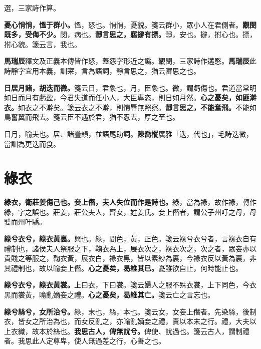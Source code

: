 \begin{quoting}選，三家詩作算。\end{quoting}

\textbf{憂心悄悄，慍于群小。}{\footnotesize 慍，怒也。悄悄，憂貌。箋云群小，眾小人在君側者。}\textbf{覯閔既多，受侮不少。}{\footnotesize 閔，病也。}\textbf{靜言思之，寤擗有摽。}{\footnotesize 靜，安也。擗，拊心也。摽，拊心貌。箋云言，我也。}

\begin{quoting}\textbf{馬瑞辰}釋文及正義本傳皆作怒，蓋怨字形近之譌。覯閔，三家詩作遘愍。\textbf{馬瑞辰}此詩靜字宜用本義，訓宷，言為語詞，靜言思之，猶云審思之也。\end{quoting}

\textbf{日居月諸，胡迭而微。}{\footnotesize 箋云日，君象也，月，臣象也。微，謂虧傷也。君道當常明如日而月有虧盈，今君失道而任小人，大臣專恣，則日如月然。}\textbf{心之憂矣，如匪澣衣。}{\footnotesize 如衣之不澣矣。箋云衣之不澣，則憒辱無照察。}\textbf{靜言思之，不能奮飛。}{\footnotesize 不能如鳥奮翼而飛去。箋云臣不遇於君，猶不忍去，厚之至也。}

\begin{quoting}日月，喻夫也。居、諸疊韻，並語尾助詞。\textbf{陳喬樅}廣雅「迭，代也」，毛詩迭微，當訓為更迭而食。\end{quoting}

\section{綠衣}


\textbf{綠衣，衛莊姜傷己也。妾上僭，夫人失位而作是詩也。}{\footnotesize 綠，當為褖，故作褖，轉作綠，字之誤也。莊姜，莊公夫人，齊女，姓姜氏。妾上僭者，謂公子州吁之母，母嬖而州吁驕。}

\textbf{綠兮衣兮，綠衣黃裏。}{\footnotesize 興也。綠，間色，黃，正色。箋云褖兮衣兮者，言褖衣自有禮制也，諸侯夫人祭服之下，鞠衣為上，展衣次之，褖衣次之，次之者，眾妾亦以貴賤之等服之，鞠衣黃，展衣白，褖衣黑，皆以素紗為裏，今褖衣反以黃為裏，非其禮制也，故以喻妾上僭。}\textbf{心之憂矣，曷維其已。}{\footnotesize 憂雖欲自止，何時能止也。}

\textbf{綠兮衣兮，綠衣黃裳。}{\footnotesize 上曰衣，下曰裳。箋云婦人之服不殊衣裳，上下同色，今衣黑而裳黃，喻亂嫡妾之禮。}\textbf{心之憂矣，曷維其亡。}{\footnotesize 箋云亡之言忘也。}

\textbf{綠兮絲兮，女所治兮。}{\footnotesize 綠，末也，絲，本也。箋云女，女妾上僭者。先染絲，後制衣，皆女之所治為也，而女反亂之，亦喻亂嫡妾之禮，責以本末之行。禮，大夫以上衣織，故本於絲也。}\textbf{我思古人，俾無訧兮。}{\footnotesize 俾使、訧過也。箋云古人，謂制禮者。我思此人定尊卑，使人無過差之行，心善之也。}

